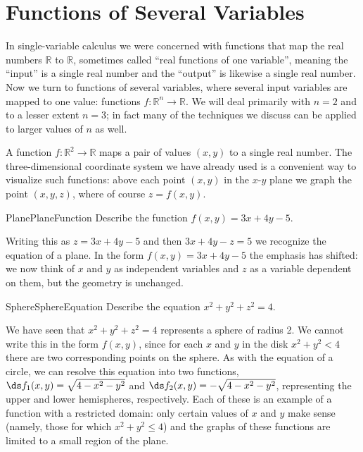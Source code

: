 \section{Functions of Several Variables}\label{sec:FunctionsSeveralVariables}

In single-variable calculus we were concerned with functions that map
the real numbers $\mathbb{R}$ to $\mathbb{R}$, sometimes called ``real functions of
one variable'', meaning the ``input'' is a single real number and the
``output'' is likewise a single real number. Now we turn to functions of several
variables, where several input variables are mapped to one value: functions
$f\colon\mathbb{R}^n\to\mathbb{R}$. We will deal primarily with $n=2$ and to a lesser
extent $n=3$; in fact many of the techniques we discuss can be applied
to larger values of $n$ as well.

A function $f\colon\mathbb{R}^2\to\mathbb{R}$ maps a pair of values $(x,y)$ to a
single real number. The three-dimensional coordinate system we have
already used is a convenient way to visualize such functions: above
each point $(x,y)$ in the $x$-$y$ plane we graph the point $(x,y,z)$,
where of course $z=f(x,y)$. 

\begin{example}{Plane}{PlaneFunction}
Describe the function $f(x,y)=3x+4y-5$.
\end{example}
\begin{solution}
Writing this as 
$z=3x+4y-5$ and then $3x+4y-z=5$ we recognize the equation of a
plane. In the form $f(x,y)=3x+4y-5$ the emphasis has shifted: we now
think of $x$ and $y$ as independent variables and $z$ as a variable
dependent on them, but the geometry is unchanged.
\end{solution}

\begin{example}{Sphere}{SphereEquation}
Describe the equation $x^2+y^2+z^2=4$.
\end{example}
\begin{solution}
We have seen that $x^2+y^2+z^2=4$ represents a sphere of radius
2. We cannot write this in the form $f(x,y)$, since for
each $x$ and $y$ in the disk $x^2+y^2<4$ there are two corresponding
points on the sphere. As with the equation of a circle, we can resolve
this equation into two functions, $\ds f_1(x,y)=\sqrt{4-x^2-y^2}$ and 
$\ds f_2(x,y)=-\sqrt{4-x^2-y^2}$, representing the upper and lower
hemispheres, respectively. Each of these is an example of a function with a
restricted domain: only certain values of $x$ and $y$ make sense
(namely, those for which $x^2+y^2\le 4$) and the graphs of these
functions are limited to a small region of the plane.
\end{solution}

